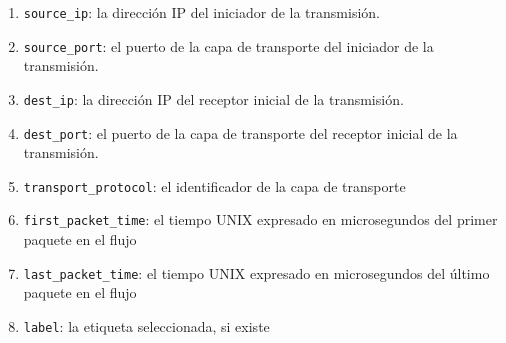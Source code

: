 \begin{enumerate}
  \item \texttt{source\_ip}: la dirección IP del iniciador de la transmisión.
  \item \texttt{source\_port}: el puerto de la capa de transporte del iniciador de la transmisión.
  \item \texttt{dest\_ip}: la dirección IP del receptor inicial de la transmisión.
  \item \texttt{dest\_port}: el puerto de la capa de transporte del receptor inicial de la transmisión.
  \item \texttt{transport\_protocol}: el identificador de la capa de transporte \cite{ipprotocolnumbers}
  \item \texttt{first\_packet\_time}: el tiempo UNIX expresado en microsegundos del primer paquete en el flujo
  \item \texttt{last\_packet\_time}:  el tiempo UNIX expresado en microsegundos del último paquete en el flujo
  \item \texttt{label}: la etiqueta seleccionada, si existe
\end{enumerate}

